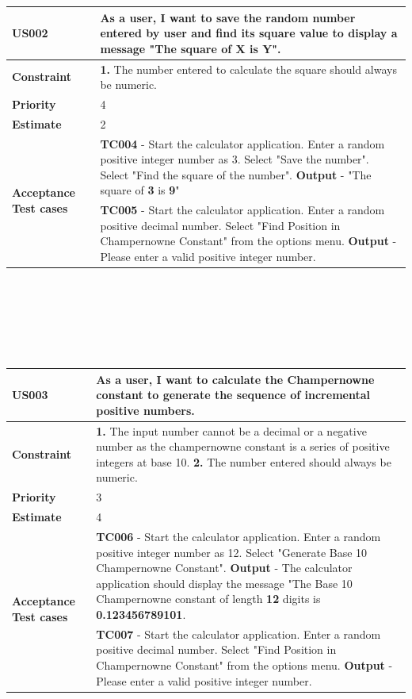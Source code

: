 \documentclass[12pt, a4paper]{report}
\begin{document}
\begin{tabular}{|p{3cm}|p{12cm}|}
\hline
     \textbf{US002} &  As a user, I want to save the random number entered by user and find its square value to display a message "The square of X is Y".\\\hline
     \textbf{Constraint} &  \textbf{1. } The number entered to calculate the square should always be numeric.\\\hline
     \textbf{Priority} & 4 \\\hline
     \textbf{Estimate} & 2 \\\hline
     \multirow{2}{3cm}{\textbf{Acceptance Test cases}} & \textbf{TC004} - Start the calculator application. Enter a random positive integer number as 3. Select "Save the number". Select "Find the square of the number". \newline \textbf{Output} - "The square of \textbf{3} is \textbf{9}"\\\cline{2-2}
     & \textbf{TC005} - Start the calculator application. Enter a random positive decimal number. Select "Find Position in Champernowne Constant" from the options menu. \newline \textbf{Output} - Please enter a valid positive integer number.\\\hline
\end{tabular}
\\\\\\\\
\\
\begin{tabular}{|p{3cm}|p{12cm}|}
\hline
     \textbf{US003} &  As a user, I want to calculate the Champernowne constant to generate the sequence of incremental positive numbers.\\\hline
     \textbf{Constraint} &  \textbf{1. } The input number cannot be a decimal or a negative number as the champernowne constant is a series of positive integers at base 10. \newline \textbf{2. } The number entered should always be numeric.\\\hline
     \textbf{Priority} & 3 \\\hline
     \textbf{Estimate} & 4 \\\hline
     \multirow{2}{3cm}{\textbf{Acceptance Test cases}} & \textbf{TC006} - Start the calculator application. Enter a random positive integer number as 12. Select "Generate Base 10 Champernowne Constant". \newline \textbf{Output} - The calculator application should display the message "The Base 10 Champernowne constant of length \textbf{12} digits is \textbf{0.123456789101}.\\\cline{2-2}
     & \textbf{TC007} - Start the calculator application. Enter a random positive decimal number. Select "Find Position in Champernowne Constant" from the options menu. \newline \textbf{Output} - Please enter a valid positive integer number.\\\hline
\end{tabular}
\end{document}
